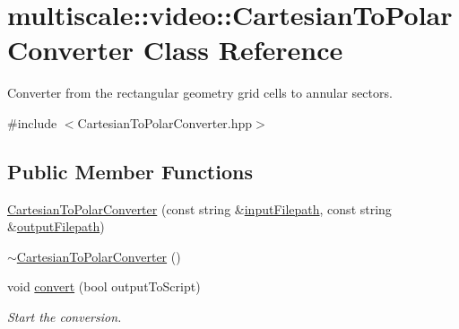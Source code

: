 \hypertarget{classmultiscale_1_1video_1_1CartesianToPolarConverter}{\section{multiscale\-:\-:video\-:\-:\-Cartesian\-To\-Polar\-Converter \-Class \-Reference}
\label{classmultiscale_1_1video_1_1CartesianToPolarConverter}
}


\-Converter from the rectangular geometry grid cells to annular sectors.  




{\ttfamily \#include $<$\-Cartesian\-To\-Polar\-Converter.\-hpp$>$}

\subsection*{\-Public \-Member \-Functions}
\begin{DoxyCompactItemize}
\item 
\hyperlink{classmultiscale_1_1video_1_1CartesianToPolarConverter_ab1c91591a31c7a23421643260335bdcd}{\-Cartesian\-To\-Polar\-Converter} (const string \&\hyperlink{classmultiscale_1_1video_1_1CartesianToPolarConverter_aa15eca9e8d3da0eb8ff1b6583e392f05}{input\-Filepath}, const string \&\hyperlink{classmultiscale_1_1video_1_1CartesianToPolarConverter_a024d95ab3b9de6ed6fd1d951c5575e65}{output\-Filepath})
\item 
\hyperlink{classmultiscale_1_1video_1_1CartesianToPolarConverter_a7842464665976d381df75f03d7c71347}{$\sim$\-Cartesian\-To\-Polar\-Converter} ()
\item 
void \hyperlink{classmultiscale_1_1video_1_1CartesianToPolarConverter_aae3e7e842456da18741bccccdf084922}{convert} (bool output\-To\-Script)
\begin{DoxyCompactList}\small\item\em \-Start the conversion. \end{DoxyCompactList}\end{DoxyCompactItemize}
